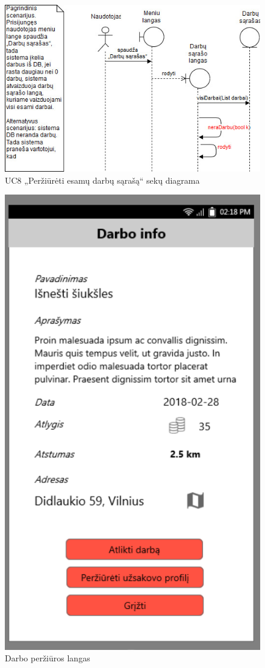 \documentclass{VUMIFPSbakalaurinis}
\begin{document}
\begin{figure}[H]
	\centering
	\includegraphics[scale=0.6]{img/Sequence/8sequence}
	\caption{UC8 „Peržiūrėti esamų darbų sąrašą“ sekų diagrama}
	\label{img:uc8seq}
\end{figure}

\begin{figure}[H]
	\centering
	\includegraphics[scale=0.4]{img/ScreenShots/6}
	\caption{Darbo peržiūros langas}
	\label{img:selected job 1}
\end{figure}
\end{document}
